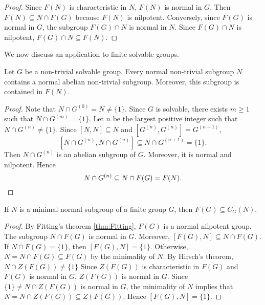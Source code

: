 \begin{proof}
Since $F(N)$ is characteristic in $N$, $F(N)$ is normal in $G$. Then 
$F(N)\subseteq N\cap F(G)$ because $F(N)$ is nilpotent.  
Conversely, since $F(G)$ is normal in $G$, the subgroup $F(G)\cap N$ is normal in $N$. Since $F(G)\cap N$
is nilpotent, $F(G)\cap N\subseteq F(N)$. 
\end{proof}

We now discuss an application to finite solvable groups.

\begin{theorem}
Let $G$ be a non-trivial solvable group. Every normal non-trivial subgroup $N$ 
contains a normal abelian non-trivial subgroup. Moreover, this subgroup is contained in $F(N)$. 
\end{theorem}

\begin{proof}
Note that $N\cap G^{(0)}=N\ne\{1\}$. Since $G$ is solvable, there exists 
$m\geq1$ such that $N\cap G^{(m)}=\{1\}$. Let $n$ be the largest positive integer such that 
$N\cap G^{(n)}\ne\{1\}$. Since $[N,N]\subseteq N$ and $[G^{(n)},G^{(n)}]=G^{(n+1)}$, 
\[
[N\cap G^{(n)},N\cap G^{(n)}]\subseteq N\cap G^{(n+1)}=\{1\}.
\]
Then $N\cap G^{(n)}$ is an abelian subgroup of $G$. Moreover, it is normal and 
nilpotent. Hence 
\[
N\cap G^{(n)}\subseteq N\cap F(G)=F(N).\qedhere
\]
\end{proof}

\begin{theorem}
\label{thm:F(G)centraliza}
If $N$ is a minimal normal subgroup of a finite group $G$, then 
$F(G)\subseteq C_G(N)$.
\end{theorem}

\begin{proof}
By Fitting's theorem \ref{thm:Fitting}, $F(G)$ is a normal nilpotent group. 
The subgroup $N\cap F(G)$ is normal in $G$. Moreover, 
$[F(G),N]\subseteq N\cap F(G)$. If $N\cap F(G)=\{1\}$, then
$[F(G),N]=\{1\}$. Otherwise, $N=N\cap F(G)\subseteq F(G)$ by the minimality of $N$. 
By Hirsch's theorem, $N\cap Z(F(G))\ne \{1\}$ 
Since $Z(F(G))$ is characteristic in $F(G)$ and 
$F(G)$ is normal in $G$, $Z(F(G))$ is normal in $G$. Since $\{1\}\ne N\cap Z(F(G))$ is 
normal in $G$, the minimality of $N$ implies that 
$N=N\cap Z(F(G))\subseteq
Z(F(G))$. Hence $[F(G),N]=\{1\}$. 
\end{proof}

